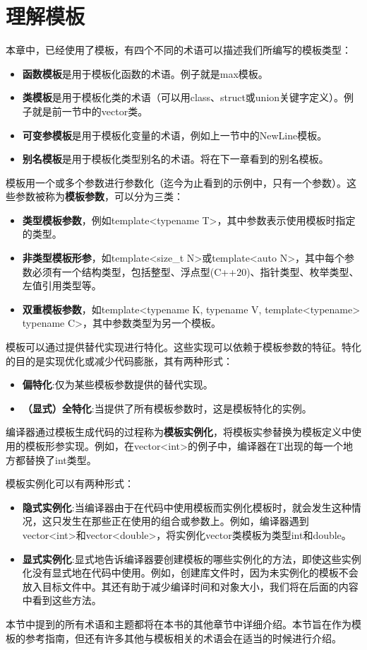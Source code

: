 \section{理解模板}
本章中，已经使用了模板，有四个不同的术语可以描述我们所编写的模板类型：

\begin{itemize}
  \item \textbf{函数模板}是用于模板化函数的术语。例子就是max模板。
  \item \textbf{类模板}是用于模板化类的术语（可以用class、struct或union关键字定义）。例子就是前一节中的vector类。
  \item \textbf{可变参模板}是用于模板化变量的术语，例如上一节中的NewLine模板。
  \item \textbf{别名模板}是用于模板化类型别名的术语。将在下一章看到的别名模板。
\end{itemize}

模板用一个或多个参数进行参数化（迄今为止看到的示例中，只有一个参数）。这些参数被称为\textbf{模板参数}，可以分为三类：

\begin{itemize}
  \item \textbf{类型模板参数}，例如template<typename T>，其中参数表示使用模板时指定的类型。
  \item \textbf{非类型模板形参}，如template<size\_t N>或template<auto N>，其中每个参数必须有一个结构类型，包括整型、浮点型(C++20)、指针类型、枚举类型、左值引用类型等。
  \item \textbf{双重模板参数}，如template<typename K, typename V, template<typename> typename C>，其中参数类型为另一个模板。
\end{itemize}

模板可以通过提供替代实现进行特化。这些实现可以依赖于模板参数的特征。特化的目的是实现优化或减少代码膨胀，其有两种形式：

\begin{itemize}
  \item \textbf{偏特化}:仅为某些模板参数提供的替代实现。
  \item \textbf{（显式）全特化}:当提供了所有模板参数时，这是模板特化的实例。
\end{itemize}

编译器通过模板生成代码的过程称为\textbf{模板实例化}，将模板实参替换为模板定义中使用的模板形参实现。例如，在vector<int>的例子中，编译器在T出现的每一个地方都替换了int类型。

模板实例化可以有两种形式：

\begin{itemize}
  \item \textbf{隐式实例化}:当编译器由于在代码中使用模板而实例化模板时，就会发生这种情况，这只发生在那些正在使用的组合或参数上。例如，编译器遇到vector<int>和vector<double>，将实例化vector类模板为类型int和double。
  \item \textbf{显式实例化}:显式地告诉编译器要创建模板的哪些实例化的方法，即使这些实例化没有显式地在代码中使用。例如，创建库文件时，因为未实例化的模板不会放入目标文件中。其还有助于减少编译时间和对象大小，我们将在后面的内容中看到这些方法。
\end{itemize}

本节中提到的所有术语和主题都将在本书的其他章节中详细介绍。本节旨在作为模板的参考指南，但还有许多其他与模板相关的术语会在适当的时候进行介绍。



